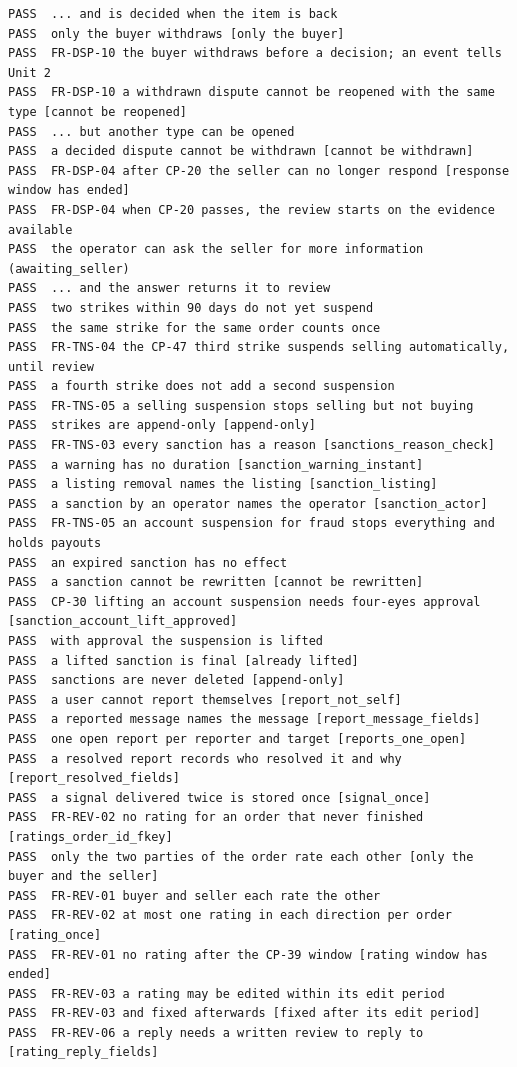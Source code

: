 \documentclass[11pt,a4paper]{article}
\begin{document}
{\begin{verbatim}
PASS  ... and is decided when the item is back
PASS  only the buyer withdraws [only the buyer]
PASS  FR-DSP-10 the buyer withdraws before a decision; an event tells Unit 2
PASS  FR-DSP-10 a withdrawn dispute cannot be reopened with the same type [cannot be reopened]
PASS  ... but another type can be opened
PASS  a decided dispute cannot be withdrawn [cannot be withdrawn]
PASS  FR-DSP-04 after CP-20 the seller can no longer respond [response window has ended]
PASS  FR-DSP-04 when CP-20 passes, the review starts on the evidence available
PASS  the operator can ask the seller for more information (awaiting_seller)
PASS  ... and the answer returns it to review
PASS  two strikes within 90 days do not yet suspend
PASS  the same strike for the same order counts once
PASS  FR-TNS-04 the CP-47 third strike suspends selling automatically, until review
PASS  a fourth strike does not add a second suspension
PASS  FR-TNS-05 a selling suspension stops selling but not buying
PASS  strikes are append-only [append-only]
PASS  FR-TNS-03 every sanction has a reason [sanctions_reason_check]
PASS  a warning has no duration [sanction_warning_instant]
PASS  a listing removal names the listing [sanction_listing]
PASS  a sanction by an operator names the operator [sanction_actor]
PASS  FR-TNS-05 an account suspension for fraud stops everything and holds payouts
PASS  an expired sanction has no effect
PASS  a sanction cannot be rewritten [cannot be rewritten]
PASS  CP-30 lifting an account suspension needs four-eyes approval [sanction_account_lift_approved]
PASS  with approval the suspension is lifted
PASS  a lifted sanction is final [already lifted]
PASS  sanctions are never deleted [append-only]
PASS  a user cannot report themselves [report_not_self]
PASS  a reported message names the message [report_message_fields]
PASS  one open report per reporter and target [reports_one_open]
PASS  a resolved report records who resolved it and why [report_resolved_fields]
PASS  a signal delivered twice is stored once [signal_once]
PASS  FR-REV-02 no rating for an order that never finished [ratings_order_id_fkey]
PASS  only the two parties of the order rate each other [only the buyer and the seller]
PASS  FR-REV-01 buyer and seller each rate the other
PASS  FR-REV-02 at most one rating in each direction per order [rating_once]
PASS  FR-REV-01 no rating after the CP-39 window [rating window has ended]
PASS  FR-REV-03 a rating may be edited within its edit period
PASS  FR-REV-03 and fixed afterwards [fixed after its edit period]
PASS  FR-REV-06 a reply needs a written review to reply to [rating_reply_fields]

\end{verbatim}}
\end{document}
